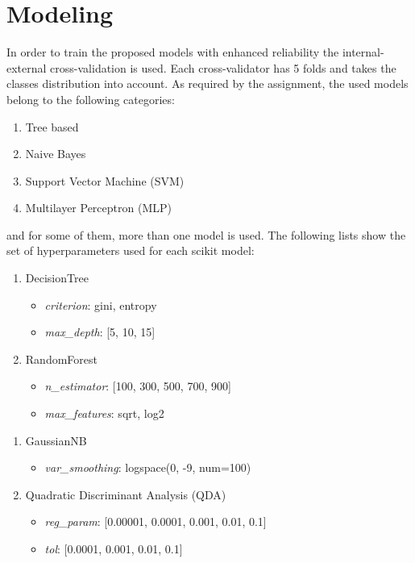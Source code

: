 \documentclass[../main]{subfiles}
\begin{document}
\section{Modeling}
In order to train the proposed models with enhanced reliability the internal-external cross-validation is used.
Each cross-validator has 5 folds and takes the classes distribution into account.
As required by the assignment, the used models belong to the following categories:
\begin{enumerate}
    \item Tree based
    \item Naive Bayes
    \item Support Vector Machine (SVM)
    \item Multilayer Perceptron (MLP)
\end{enumerate}

and for some of them, more than one model is used.
The following lists show the set of hyperparameters used for each scikit model:
\begin{enumerate}[label=1.\arabic*]
    \item DecisionTree
    \begin{itemize}
        \item \textit{criterion}: gini, entropy
        \item \textit{max\_depth}: [5, 10, 15]
    \end{itemize}
    \item RandomForest
    \begin{itemize}
        \item \textit{n\_estimator}: [100, 300, 500, 700, 900]
        \item \textit{max\_features}: sqrt, log2
    \end{itemize} 
\end{enumerate}

\begin{enumerate}[label=2.\arabic*]
    \item GaussianNB
    \begin{itemize}
        \item \textit{var\_smoothing}: logspace(0, -9, num=100)
    \end{itemize}
    \item Quadratic Discriminant Analysis (QDA)
    \begin{itemize}
        \item \textit{reg\_param}: [0.00001, 0.0001, 0.001, 0.01, 0.1]
        \item \textit{tol}: [0.0001, 0.001, 0.01, 0.1]
    \end{itemize}
\end{enumerate}
\end{document}
